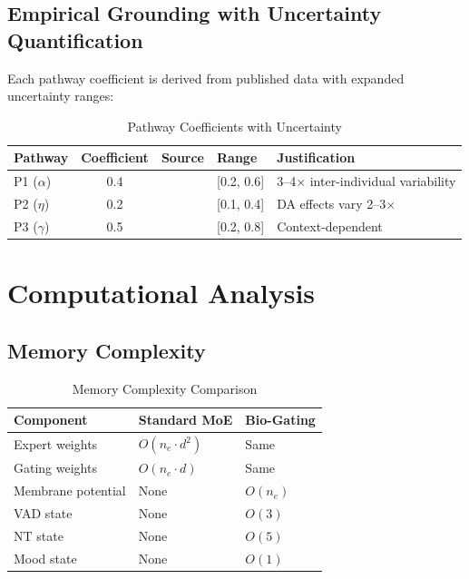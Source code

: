 \documentclass[preprint,12pt]{elsarticle}
\begin{document}
\subsection{Empirical Grounding with Uncertainty Quantification}

Each pathway coefficient is derived from published data with expanded uncertainty ranges:

\begin{table}[htbp]
\centering
\caption{Pathway Coefficients with Uncertainty}
\label{tab:coefficients}
\begin{tabular}{lclll}
\toprule
\textbf{Pathway} & \textbf{Coefficient} & \textbf{Source} & \textbf{Range} & \textbf{Justification} \\
\midrule
P1 ($\alpha$) & 0.4 & \cite{arnsten2009} & [0.2, 0.6] & 3--4$\times$ inter-individual variability \\
P2 ($\eta$) & 0.2 & \cite{cools2011} & [0.1, 0.4] & DA effects vary 2--3$\times$ \\
P3 ($\gamma$) & 0.5 & \cite{dunbar2009} & [0.2, 0.8] & Context-dependent \\
\bottomrule
\end{tabular}
\end{table}

\section{Computational Analysis}
\label{sec:computational}

\subsection{Memory Complexity}

\begin{table}[htbp]
\centering
\caption{Memory Complexity Comparison}
\label{tab:mem_complexity}
\begin{tabular}{lll}
\toprule
\textbf{Component} & \textbf{Standard MoE} & \textbf{Bio-Gating} \\
\midrule
Expert weights & $O(n_e \cdot d^2)$ & Same \\
Gating weights & $O(n_e \cdot d)$ & Same \\
Membrane potential & None & $O(n_e)$ \\
VAD state & None & $O(3)$ \\
NT state & None & $O(5)$ \\
Mood state & None & $O(1)$ \\
\bottomrule
\end{tabular}
\end{table}
\end{document}
